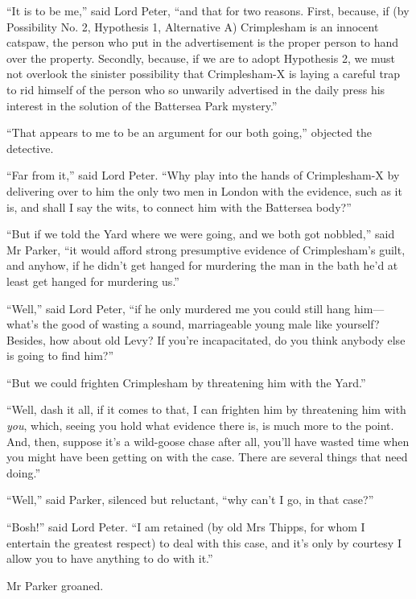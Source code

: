 \enquote{It is to be me,} said Lord Peter, \enquote{and that for two reasons. First, because, if (by Possibility No. 2, Hypothesis 1, Alternative A) Crimplesham is an innocent catspaw, the person who put in the advertisement is the proper person to hand over the property. Secondly, because, if we are to adopt Hypothesis 2, we must not overlook the sinister possibility that Crimplesham-X is laying a careful trap to rid himself of the person who so unwarily advertised in the daily press his interest in the solution of the Battersea Park mystery.}

\enquote{That appears to me to be an argument for our both going,} objected the detective.

\enquote{Far from it,} said Lord Peter. \enquote{Why play into the hands of Crimplesham-X by delivering over to him the only two men in London with the evidence, such as it is, and shall I say the wits, to connect him with the Battersea body?}

\enquote{But if we told the Yard where we were going, and we both got nobbled,} said Mr Parker, \enquote{it would afford strong presumptive evidence of Crimplesham’s guilt, and anyhow, if he didn’t get hanged for murdering the man in the bath he’d at least get hanged for murdering us.}

\enquote{Well,} said Lord Peter, \enquote{if he only murdered me you could still hang him\allowbreak---\allowbreak what’s the good of wasting a sound, marriageable young male like yourself? Besides, how about old Levy? If you’re incapacitated, do you think anybody else is going to find him?}

\enquote{But we could frighten Crimplesham by threatening him with the Yard.}

\enquote{Well, dash it all, if it comes to that, I can frighten him by threatening him with \textit{you}, which, seeing you hold what evidence there is, is much more to the point. And, then, suppose it’s a wild-goose chase after all, you’ll have wasted time when you might have been getting on with the case. There are several things that need doing.}

\enquote{Well,} said Parker, silenced but reluctant, \enquote{why can’t I go, in that case?}

\enquote{Bosh!} said Lord Peter. \enquote{I am retained (by old Mrs Thipps, for whom I entertain the greatest respect) to deal with this case, and it’s only by courtesy I allow you to have anything to do with it.}

Mr Parker groaned.

